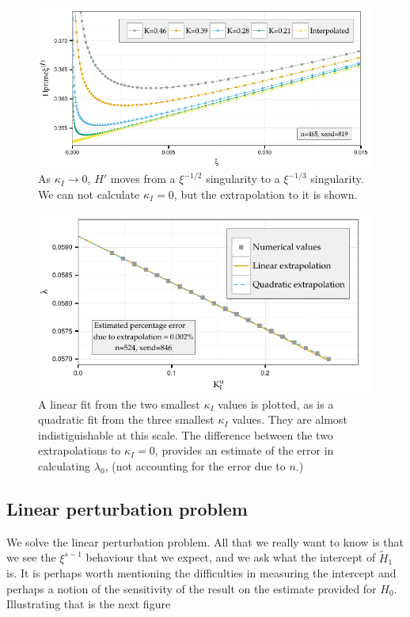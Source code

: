 \documentclass{jfm}
\begin{document}
\begin{figure}
  \centerline{\includegraphics{./../../Graphs/hprime-x.pdf}}
  \caption{As $\kappa_I\to 0$, $H'$ moves from a $\xi^{-1/2}$ singularity
           to a $\xi^{-1/3}$ singularity. We can not calculate $\kappa_I=0$, 
           but the extrapolation to it is shown.}
\end{figure}
\begin{figure}
  \centerline{\includegraphics{./../../Graphs/l0.pdf}}
  \caption{A linear fit from the two smallest $\kappa_I$ values is plotted, 
           as is a quadratic fit from the three smallest $\kappa_I$ values.
           They are almost indistiguishable at this scale. 
           The difference between the two extrapolations to $\kappa_I=0$,  
           provides an estimate of the error in calculating $\lambda_0$, 
           (not accounting for the error due to $n$.) }
\end{figure}

\subsection{Linear perturbation problem}
We solve the linear perturbation problem. All that we really want to know
is that we see the $\xi^{s-1}$ behaviour that we expect, and we ask what the
intercept of $\tilde{H}_1$ is. It is perhaps worth mentioning the difficulties
in measuring the intercept and perhaps a notion of the sensitivity of the 
result on the estimate provided for $H_0$. Illustrating that is the next
figure 
\end{document}
